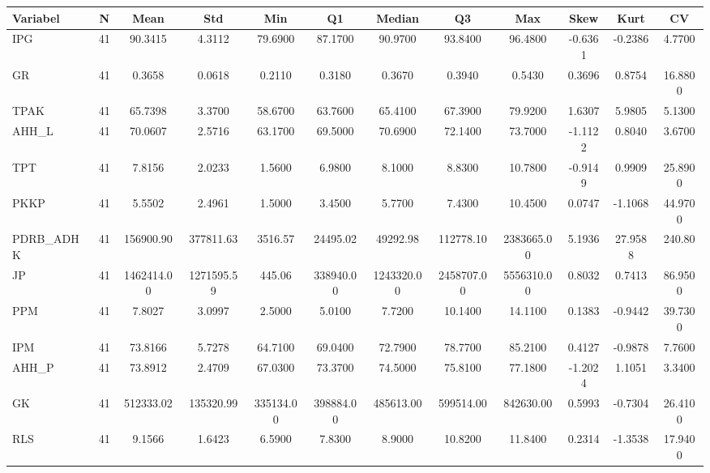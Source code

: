 \begin{adjustbox}{max width=\textwidth}
\small
\begin{tabular}{|p{2.5cm}|c|c|c|c|c|c|c|c|c|c|c|}
\hline
\textbf{Variabel} & \textbf{N} & \textbf{Mean} & \textbf{Std} & \textbf{Min} & \textbf{Q1} & \textbf{Median} & \textbf{Q3} & \textbf{Max} & \textbf{Skew} & \textbf{Kurt} & \textbf{CV} \\
\hline
IPG & 41 & 90.3415 & 4.3112 & 79.6900 & 87.1700 & 90.9700 & 93.8400 & 96.4800 & -0.6361 & -0.2386 & 4.7700 \\
GR & 41 & 0.3658 & 0.0618 & 0.2110 & 0.3180 & 0.3670 & 0.3940 & 0.5430 & 0.3696 & 0.8754 & 16.8800 \\
TPAK & 41 & 65.7398 & 3.3700 & 58.6700 & 63.7600 & 65.4100 & 67.3900 & 79.9200 & 1.6307 & 5.9805 & 5.1300 \\
AHH\_L & 41 & 70.0607 & 2.5716 & 63.1700 & 69.5000 & 70.6900 & 72.1400 & 73.7000 & -1.1122 & 0.8040 & 3.6700 \\
TPT & 41 & 7.8156 & 2.0233 & 1.5600 & 6.9800 & 8.1000 & 8.8300 & 10.7800 & -0.9149 & 0.9909 & 25.8900 \\
PKKP & 41 & 5.5502 & 2.4961 & 1.5000 & 3.4500 & 5.7700 & 7.4300 & 10.4500 & 0.0747 & -1.1068 & 44.9700 \\
PDRB\_ADHK & 41 & 156900.90 & 377811.63 & 3516.57 & 24495.02 & 49292.98 & 112778.10 & 2383665.00 & 5.1936 & 27.9588 & 240.80 \\
JP & 41 & 1462414.00 & 1271595.59 & 445.06 & 338940.00 & 1243320.00 & 2458707.00 & 5556310.00 & 0.8032 & 0.7413 & 86.9500 \\
PPM & 41 & 7.8027 & 3.0997 & 2.5000 & 5.0100 & 7.7200 & 10.1400 & 14.1100 & 0.1383 & -0.9442 & 39.7300 \\
IPM & 41 & 73.8166 & 5.7278 & 64.7100 & 69.0400 & 72.7900 & 78.7700 & 85.2100 & 0.4127 & -0.9878 & 7.7600 \\
AHH\_P & 41 & 73.8912 & 2.4709 & 67.0300 & 73.3700 & 74.5000 & 75.8100 & 77.1800 & -1.2024 & 1.1051 & 3.3400 \\
GK & 41 & 512333.02 & 135320.99 & 335134.00 & 398884.00 & 485613.00 & 599514.00 & 842630.00 & 0.5993 & -0.7304 & 26.4100 \\
RLS & 41 & 9.1566 & 1.6423 & 6.5900 & 7.8300 & 8.9000 & 10.8200 & 11.8400 & 0.2314 & -1.3538 & 17.9400 \\
\hline
\end{tabular}
\end{adjustbox}
